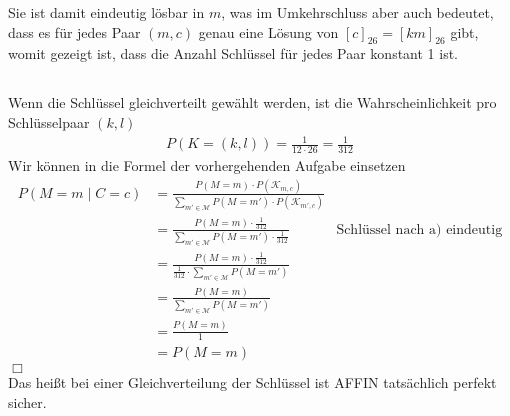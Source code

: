 \documentclass{../crypto}
\begin{document}
Sie ist damit eindeutig lösbar in $m$, was im Umkehrschluss aber auch bedeutet,
dass es für jedes Paar $(m,c)$ genau eine Lösung von
$\left[c\right]_{26}=\left[km\right]_{26}$ gibt, womit gezeigt ist, dass die
Anzahl Schlüssel für jedes Paar konstant 1 ist.

\subsection{}

Wenn die Schlüssel gleichverteilt gewählt werden, ist die Wahrscheinlichkeit pro Schlüsselpaar $(k,l)$
\begin{align*}
   P(K=(k,l)) = \frac{1}{12\cdot 26} = \frac{1}{312}
\end{align*}
Wir können in die Formel der vorhergehenden Aufgabe einsetzen
\begin{align*}
P(M=m \mid C=c) &= \frac{P(M=m)\cdot P(\mathcal{K}_{m,c})}{\sum_{m'\in\mathcal{M}} P(M=m')\cdot P(\mathcal{K}_{m',c})} \\
            &= \frac{P(M=m)\cdot \frac{1}{312}}{\sum_{m'\in\mathcal{M}}
P(M=m')\cdot \frac{1}{312}} & \text{Schlüssel nach a) eindeutig}\\
            &= \frac{P(M=m)\cdot \frac{1}{312}}{\frac{1}{312}\cdot\sum_{m'\in\mathcal{M}} P(M=m')} \\
            &= \frac{P(M=m)}{\sum_{m'\in\mathcal{M}} P(M=m')} \\
            &= \frac{P(M=m)}{1} \\
            &= P(M=m)
\end{align*}
\hfill$\Box$ \\
Das heißt bei einer Gleichverteilung der Schlüssel ist AFFIN tatsächlich perfekt sicher.
\end{document}
